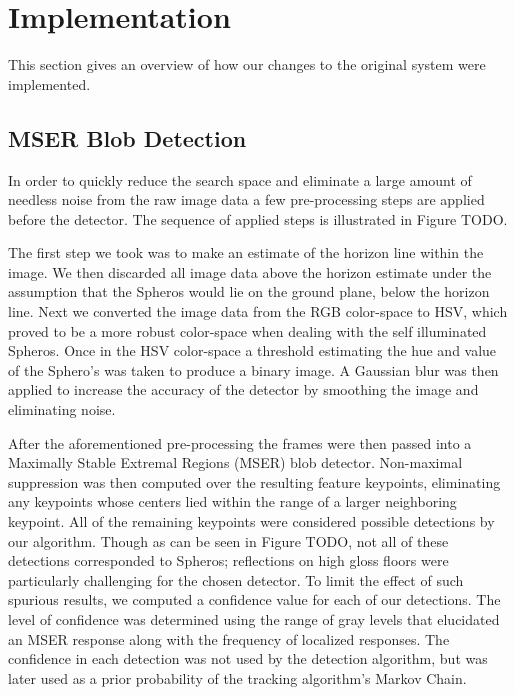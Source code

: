 \section{Implementation}
\label{sec:impl}

This section gives an overview of how our changes to the original system were implemented.

\subsection{MSER Blob Detection}
In order to quickly reduce the search space and eliminate a large amount of needless noise from the raw image data a few
pre-processing steps are applied before the detector. The sequence of applied steps is illustrated in Figure TODO.

The first step we took was to make an estimate of the horizon line within the image. We then discarded all image data above the
horizon estimate under the assumption that the Spheros would lie on the ground plane, below the horizon line. Next we
converted the image data from the RGB color-space to HSV, which proved to be a more robust color-space when dealing with
the self illuminated Spheros. Once in the HSV color-space a threshold estimating the hue and value of the Sphero's was taken to
produce a binary image. A Gaussian blur was then applied to increase the accuracy of the detector by smoothing the image and
eliminating noise.

After the aforementioned pre-processing the frames were then passed into a Maximally Stable Extremal Regions (MSER) blob
detector. Non-maximal suppression was then computed over the resulting feature keypoints, eliminating any keypoints whose
centers lied within the range of a larger neighboring keypoint. All of the remaining keypoints were considered possible detections
by our algorithm. Though as can be seen in Figure TODO, not all of these detections corresponded to Spheros; reflections on
high gloss floors were particularly challenging for the chosen detector. To limit the effect of such spurious results, we computed a
confidence value for each of our detections. The level of confidence was determined using the range of gray levels that
elucidated an MSER response along with the frequency of localized responses. The confidence in each detection was not used
by the detection algorithm, but was later used as a prior probability of the tracking algorithm's Markov Chain.

